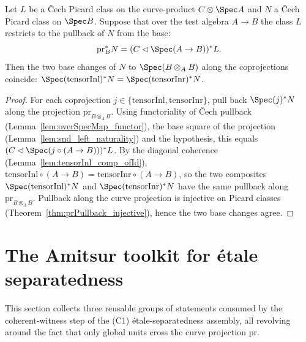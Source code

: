 \begin{theorem}
  \label{thm:cechPicMap_tensorInl_eq_tensorInr}
  \leanok
  Let \(L\) be a \v Cech Picard class on the curve-product \(C \otimes \Spec A\) and \(N\) a \v
  Cech Picard class on \(\Spec B\).  Suppose that over the test algebra \(A \to B\) the class
  \(L\) restricts to the pullback of \(N\) from the base:
  \[
    \mathrm{pr}_B^{*} N = (C \lhd \Spec(A \to B))^{*} L.
  \]
  Then the two base changes of \(N\) to \(\Spec(B \otimes_A B)\) along the coprojections
  coincide:
  \(\Spec(\mathrm{tensorInl})^{*} N = \Spec(\mathrm{tensorInr})^{*} N\).
\end{theorem}
\begin{proof}
  \leanok
  For each coprojection \(j \in \{\mathrm{tensorInl}, \mathrm{tensorInr}\}\), pull back
  \(\Spec(j)^{*} N\) along the projection \(\mathrm{pr}_{B \otimes_A B}\).  Using functoriality
  of \v Cech pullback (Lemma~\ref{lem:overSpecMap_functor}), the base square of the projection
  (Lemma~\ref{lem:snd_left_naturality}) and the hypothesis, this equals \((C \lhd \Spec(j
  \circ (A \to B)))^{*} L\).  By the diagonal coherence
  (Lemma~\ref{lem:tensorInl_comp_ofId}), \(\mathrm{tensorInl} \circ (A \to B) = \mathrm{tensorInr}
  \circ (A \to B)\), so the two composites \(\Spec(\mathrm{tensorInl})^{*} N\) and
  \(\Spec(\mathrm{tensorInr})^{*} N\) have the same pullback along \(\mathrm{pr}_{B \otimes_A
  B}\).  Pullback along the curve projection is injective on Picard classes
  (Theorem~\ref{thm:prPullback_injective}), hence the two base changes agree.
\end{proof}

\section{The Amitsur toolkit for \'etale separatedness}
\label{sec:amitsurCochain}

This section collects three reusable groups of statements consumed by the coherent-witness
step of the (C1) \'etale-separatedness assembly, all revolving around the fact that only global
units cross the curve projection \(\mathrm{pr}\).

